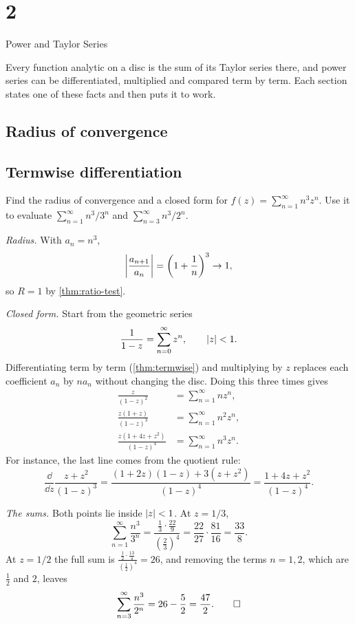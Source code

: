 \chapter{2}{Power and Taylor Series}

Every function analytic on a disc is the sum of its Taylor series there, and
power series can be differentiated, multiplied and compared term by term. Each
section states one of these facts and then puts it to work.

\section{Radius of convergence}\label{sec:radius}




\section{Termwise differentiation}\label{sec:termwise}



\begin{exercise}\label{ex:sum-n-cubed}
  Find the radius of convergence and a closed form for
  $f(z) = \sum_{n=1}^{\infty} n^3 z^n$. Use it to evaluate
  $\sum_{n=1}^{\infty} n^3 / 3^n$ and $\sum_{n=3}^{\infty} n^3 / 2^n$.
\end{exercise}

\begin{solution}
  \emph{Radius.} With $a_n = n^3$,
  \[
    \abs*{\frac{a_{n+1}}{a_n}} = \left(1 + \frac{1}{n}\right)^3 \to 1,
  \]
  so $R = 1$ by \cref{thm:ratio-test}.

  \emph{Closed form.} Start from the geometric series
  \[
    \frac{1}{1 - z} = \sum_{n=0}^{\infty} z^n, \qquad \abs{z} < 1.
  \]
  Differentiating term by term (\cref{thm:termwise}) and multiplying by $z$
  replaces each coefficient $a_n$ by $n a_n$ without changing the disc.
  Doing this three times gives
  \begin{align*}
    \frac{z}{(1-z)^2}             &= \sum_{n=1}^{\infty} n z^n, \\
    \frac{z(1+z)}{(1-z)^3}        &= \sum_{n=1}^{\infty} n^2 z^n, \\
    \frac{z(1 + 4z + z^2)}{(1-z)^4} &= \sum_{n=1}^{\infty} n^3 z^n.
  \end{align*}
  For instance, the last line comes from the quotient rule:
  \[
    \frac{\dd}{\dd z} \frac{z + z^2}{(1-z)^3}
    = \frac{(1 + 2z)(1 - z) + 3(z + z^2)}{(1-z)^4}
    = \frac{1 + 4z + z^2}{(1-z)^4}.
  \]

  \emph{The sums.} Both points lie inside $\abs{z} < 1$. At $z = 1/3$,
  \[
    \sum_{n=1}^{\infty} \frac{n^3}{3^n}
    = \frac{\frac13 \cdot \frac{22}{9}}{\left(\frac23\right)^4}
    = \frac{22}{27} \cdot \frac{81}{16}
    = \frac{33}{8}.
  \]
  At $z = 1/2$ the full sum is
  $\frac{\frac12 \cdot \frac{13}{4}}{\left(\frac12\right)^4} = 26$, and removing
  the terms $n = 1, 2$, which are $\frac12$ and $2$, leaves
  \[
    \sum_{n=3}^{\infty} \frac{n^3}{2^n} = 26 - \frac52 = \frac{47}{2}. \qedhere
  \]
\end{solution}

